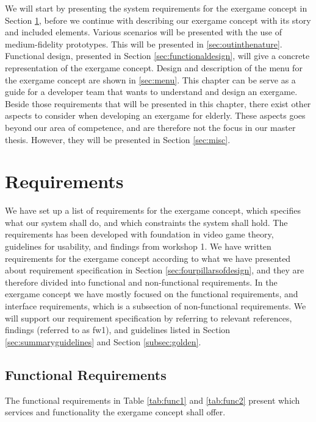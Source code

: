We will start by presenting the system requirements for the exergame concept in Section \ref{sec:req}, before we continue with describing our exergame concept with its story and included elements. Various scenarios will be presented with the use of medium-fidelity prototypes. This will be presented in \ref{sec:outinthenature}. Functional design, presented in Section \ref{sec:functionaldesign}, will give a concrete representation of the exergame concept. Design and description of the menu for the exergame concept are shown in \ref{sec:menu}. This chapter can be serve as a guide for a developer team that wants to understand and design an exergame. Beside those requirements that will be presented in this chapter, there exist other aspects to consider when developing an exergame for elderly. These aspects goes beyond our area of competence, and are therefore not the focus in our master thesis. However, they will be presented in Section \ref{sec:misc}.

\section{Requirements}
\label{sec:req}
We have set up a list of requirements for the exergame concept, which specifies what our system shall do, and which constraints the system shall hold. The requirements has been developed with foundation in video game theory, guidelines for usability, and findings from workshop 1. We have written requirements for the exergame concept according to what we have presented about requirement specification in Section \ref{sec:fourpillarsofdesign}, and they are therefore divided into functional and non-functional requirements. In the exergame concept we have mostly focused on the functional requirements, and interface requirements, which is a subsection of non-functional requirements. We will support our requirement specification by referring to relevant references, findings (referred to as fw1), and guidelines listed in Section \ref{sec:summaryguidelines} and Section \ref{subsec:golden}.

\subsection{Functional Requirements}
The functional requirements in Table \ref{tab:func1} and \ref{tab:func2} present which services and functionality the exergame concept shall offer.

